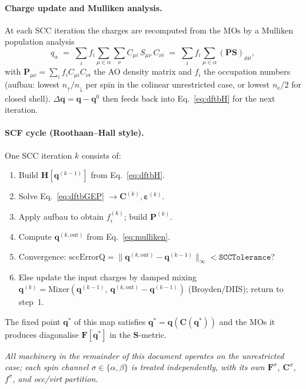 \documentclass[11pt,a4paper]{article}
\newcommand{\HH}{\mathbf{H}}
\newcommand{\FF}{\mathbf{F}}
\newcommand{\CC}{\mathbf{C}}
\newcommand{\SS}{\mathbf{S}}
\newcommand{\qq}{\mathbf{q}}
\begin{document}
\paragraph{Charge update and Mulliken analysis.}
At each SCC iteration the charges are recomputed from the MOs by a
Mulliken population analysis
\begin{equation}
q_\alpha \;=\; \sum_i f_i \!\! \sum_{\mu\in\alpha}\sum_\nu
       C_{\mu i}\, S_{\mu\nu}\, C_{\nu i}
\;=\; \sum_i f_i \!\! \sum_{\mu\in\alpha} (\mathbf{P}\SS)_{\mu\mu},
\label{eq:mulliken}
\end{equation}
with $\mathbf{P}_{\mu\nu}=\sum_i f_i C_{\mu i}C_{\nu i}$ the AO density
matrix and $f_i$ the occupation numbers (aufbau: lowest $n_\uparrow /
n_\downarrow$ per spin in the colinear unrestricted case, or lowest
$n_\mathrm{e}/2$ for closed shell). $\Delta\qq=\qq-\qq^{0}$ then feeds
back into Eq.~\eqref{eq:dftbH} for the next iteration.

\paragraph{SCF cycle (Roothaan--Hall style).}
One SCC iteration $k$ consists of:
\begin{enumerate}[leftmargin=*,nosep]
\item Build $\HH[\qq^{(k-1)}]$ from Eq.~\eqref{eq:dftbH}.
\item Solve Eq.~\eqref{eq:dftbGEP} $\to \CC^{(k)}, \bm{\varepsilon}^{(k)}$.
\item Apply aufbau to obtain $f_i^{(k)}$; build $\mathbf{P}^{(k)}$.
\item Compute $\qq^{(k,\mathrm{out})}$ from Eq.~\eqref{eq:mulliken}.
\item Convergence: $\mathrm{sccErrorQ}=\|\qq^{(k,\mathrm{out})}-\qq^{(k-1)}\|_\infty < \mathtt{SCCTolerance}$?
\item Else update the input charges by damped mixing
$\qq^{(k)} = \mathrm{Mixer}(\qq^{(k-1)},\,\qq^{(k,\mathrm{out})}-\qq^{(k-1)})$ (Broyden/DIIS); return to step~1.
\end{enumerate}
The fixed point $\qq^*$ of this map satisfies $\qq^*=\qq(\CC(\qq^*))$
and the MOs it produces diagonalise $\FF[\qq^*]$ in the $\SS$-metric.

\emph{All machinery in the remainder of this document operates on the
unrestricted case; each spin channel $\sigma\in\{\alpha,\beta\}$ is
treated independently, with its own $\FF^\sigma$, $\CC^\sigma$,
$f^\sigma$, and occ/virt partition.}
\end{document}

